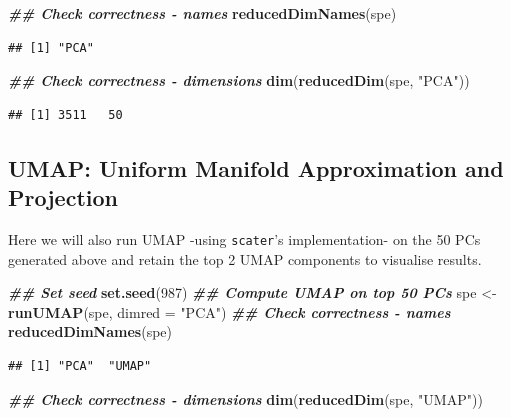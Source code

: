 \documentclass[
]{book}
\newenvironment{Shaded}{\begin{snugshade}}{\end{snugshade}}
\newcommand{\AttributeTok}[1]{\textcolor[rgb]{0.13,0.29,0.53}{#1}}
\newcommand{\DecValTok}[1]{\textcolor[rgb]{0.00,0.00,0.81}{#1}}
\newcommand{\DocumentationTok}[1]{\textcolor[rgb]{0.56,0.35,0.01}{\textbf{\textit{#1}}}}
\newcommand{\FunctionTok}[1]{\textcolor[rgb]{0.13,0.29,0.53}{\textbf{#1}}}
\newcommand{\NormalTok}[1]{#1}
\newcommand{\OtherTok}[1]{\textcolor[rgb]{0.56,0.35,0.01}{#1}}
\newcommand{\StringTok}[1]{\textcolor[rgb]{0.31,0.60,0.02}{#1}}
\begin{document}
\begin{Shaded}
\begin{Highlighting}[]
\DocumentationTok{\#\# Check correctness {-} names}
\FunctionTok{reducedDimNames}\NormalTok{(spe)}
\end{Highlighting}
\end{Shaded}

\begin{verbatim}
## [1] "PCA"
\end{verbatim}

\begin{Shaded}
\begin{Highlighting}[]
\DocumentationTok{\#\# Check correctness {-} dimensions}
\FunctionTok{dim}\NormalTok{(}\FunctionTok{reducedDim}\NormalTok{(spe, }\StringTok{"PCA"}\NormalTok{))}
\end{Highlighting}
\end{Shaded}

\begin{verbatim}
## [1] 3511   50
\end{verbatim}

\hypertarget{umap-uniform-manifold-approximation-and-projection}{%
\subsection{UMAP: Uniform Manifold Approximation and Projection}\label{umap-uniform-manifold-approximation-and-projection}}

Here we will also run UMAP -using \texttt{scater}'s implementation- on the 50 PCs generated above and retain the top 2 UMAP components to visualise results.

\begin{Shaded}
\begin{Highlighting}[]
\DocumentationTok{\#\# Set seed}
\FunctionTok{set.seed}\NormalTok{(}\DecValTok{987}\NormalTok{)}
\DocumentationTok{\#\# Compute UMAP on top 50 PCs}
\NormalTok{spe }\OtherTok{\textless{}{-}} \FunctionTok{runUMAP}\NormalTok{(spe, }\AttributeTok{dimred =} \StringTok{"PCA"}\NormalTok{)}
\DocumentationTok{\#\# Check correctness {-} names}
\FunctionTok{reducedDimNames}\NormalTok{(spe)}
\end{Highlighting}
\end{Shaded}

\begin{verbatim}
## [1] "PCA"  "UMAP"
\end{verbatim}

\begin{Shaded}
\begin{Highlighting}[]
\DocumentationTok{\#\# Check correctness {-} dimensions}
\FunctionTok{dim}\NormalTok{(}\FunctionTok{reducedDim}\NormalTok{(spe, }\StringTok{"UMAP"}\NormalTok{))}
\end{Highlighting}
\end{Shaded}
\end{document}
